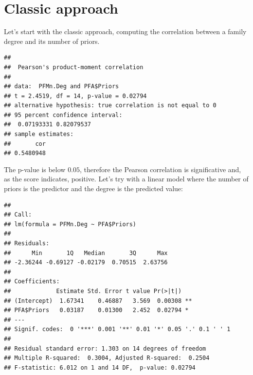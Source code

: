 \documentclass[
  notitlepage,
  onecolumn,
  openany]{book}
\newenvironment{Shaded}{\begin{snugshade}}{\end{snugshade}}
\newcommand{\CommentTok}[1]{\textcolor[rgb]{0.56,0.35,0.01}{\textit{#1}}}
\newcommand{\DocumentationTok}[1]{\textcolor[rgb]{0.56,0.35,0.01}{\textbf{\textit{#1}}}}
\newcommand{\FunctionTok}[1]{\textcolor[rgb]{0.00,0.00,0.00}{#1}}
\newcommand{\NormalTok}[1]{#1}
\newcommand{\OtherTok}[1]{\textcolor[rgb]{0.56,0.35,0.01}{#1}}
\newcommand{\SpecialCharTok}[1]{\textcolor[rgb]{0.00,0.00,0.00}{#1}}
\begin{document}
\hypertarget{classic-approach-1}{%
\section{Classic approach}\label{classic-approach-1}}

Let's start with the classic approach, computing the correlation between a family degree and its number of priors.

\begin{Shaded}
\end{Shaded}

\begin{verbatim}
## 
##  Pearson's product-moment correlation
## 
## data:  PFMn.Deg and PFA$Priors
## t = 2.4519, df = 14, p-value = 0.02794
## alternative hypothesis: true correlation is not equal to 0
## 95 percent confidence interval:
##  0.07193331 0.82079537
## sample estimates:
##       cor 
## 0.5480948
\end{verbatim}

The p-value is below \(0.05\), therefore the Pearson correlation is significative and, as the score indicates, positive. Let's try with a linear model where the number of priors is the predictor and the degree is the predicted value:

\begin{Shaded}
\end{Shaded}

\begin{verbatim}
## 
## Call:
## lm(formula = PFMn.Deg ~ PFA$Priors)
## 
## Residuals:
##      Min       1Q   Median       3Q      Max 
## -2.36244 -0.69127 -0.02179  0.70515  2.63756 
## 
## Coefficients:
##             Estimate Std. Error t value Pr(>|t|)   
## (Intercept)  1.67341    0.46887   3.569  0.00308 **
## PFA$Priors   0.03187    0.01300   2.452  0.02794 * 
## ---
## Signif. codes:  0 '***' 0.001 '**' 0.01 '*' 0.05 '.' 0.1 ' ' 1
## 
## Residual standard error: 1.303 on 14 degrees of freedom
## Multiple R-squared:  0.3004, Adjusted R-squared:  0.2504 
## F-statistic: 6.012 on 1 and 14 DF,  p-value: 0.02794
\end{verbatim}
\end{document}
